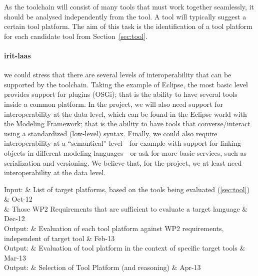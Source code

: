 \documentclass{template/openetcs_article}
\begin{document}
As the toolchain will consist of many tools that must work together seamlessly, it should be analysed independently from the tool.  A tool will typically suggest a certain tool platform.  The aim of this task is the identification of a tool platform for each candidate tool from Section~\ref{sec:tool}.


\paragraph{irit-laas} we could stress that there are several levels
of interoperability that can be supported by the toolchain. Taking the
example of Eclipse, the most basic level provides support for plugins
(OSGi); that is the ability to have several tools inside a common
platform. In the project, we will also need support for
interoperability at the data level, which can be found in the Eclipse
world with the Modeling Framework; that is the ability to have tools
that converse/interact using a standardized (low-level)
syntax. Finally, we could also require interoperability at a
``semantical'' level---for example with support for linking objects in
different modeling languages---or ask for more basic services, such as
serialization and versioning. We believe that, for the project, we at
least need interoperability at the data level.

\begin{inoutput}
Input: & List of target platforms, based on the tools being evaluated (\ref{sec:tool}) & Oct-12 \\
& Those WP2 Requirements that are sufficient to evaluate a target language & Dec-12 \\
\hline
Output: & Evaluation of each tool platform against WP2 requirements, independent of target tool & Feb-13 \\
Output: & Evaluation of tool platform in the context of specific target tools & Mar-13 \\
Output: & Selection of Tool Platform (and reasoning) & Apr-13 \\
\end{inoutput}
\end{document}
